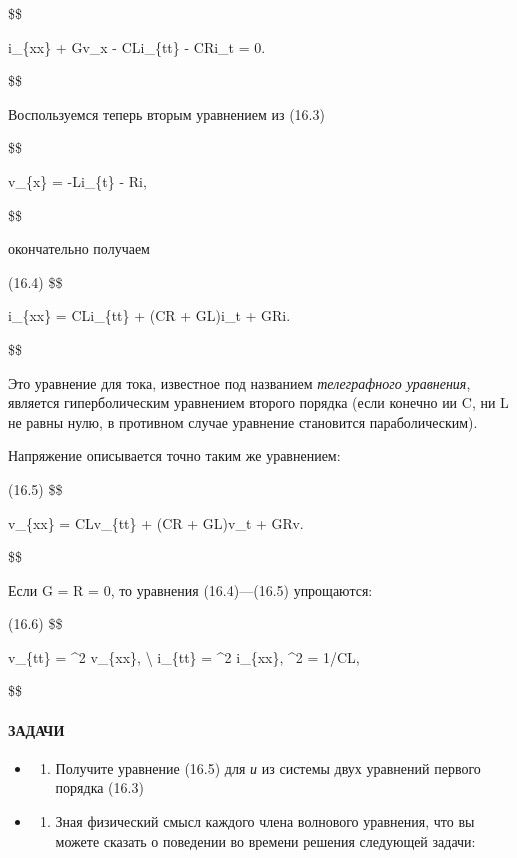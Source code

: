 \documentclass[
  ukrainian,
]{article}
\providecommand{\tightlist}{%
  \setlength{\itemsep}{0pt}\setlength{\parskip}{0pt}}
\begin{document}
\$\$

i\_\{xx\} + Gv\_x - CLi\_\{tt\} - CRi\_t = 0.

\$\$

Воспользуемся теперь вторым уравнением из (16.3)

\$\$

v\_\{x\} = -Li\_\{t\} - Ri,

\$\$

окончательно получаем

(16.4) \$\$

i\_\{xx\} = CLi\_\{tt\} + (CR + GL)i\_t + GRi.

\$\$

Это уравнение для тока, известное под названием \emph{телеграфного
уравнения}, является гиперболическим уравнением второго порядка (если
конечно ии C, ни L не равны нулю, в противном случае уравнение
становится параболическим).

Напряжение описывается точно таким же уравнением:

(16.5) \$\$

v\_\{xx\} = CLv\_\{tt\} + (CR + GL)v\_t + GRv.

\$\$

Если G = R = 0, то уравнения (16.4)---(16.5) упрощаются:

(16.6) \$\$

v\_\{tt\} = \alpha\^{}2 v\_\{xx\}, \textbackslash{} i\_\{tt\} =
\alpha\^{}2 i\_\{xx\}, \qquad \alpha\^{}2 = 1/CL,

\$\$

\paragraph{ЗАДАЧИ}\label{ux437ux430ux434ux430ux447ux438-1}

\begin{itemize}
\tightlist
\item
  \begin{enumerate}
  \def\labelenumi{\arabic{enumi}.}
  \tightlist
  \item
    Получите уравнение (16.5) для \emph{и} из системы двух уравнений
    первого порядка (16.3)
  \end{enumerate}
\item
  \begin{enumerate}
  \def\labelenumi{\arabic{enumi}.}
  \setcounter{enumi}{1}
  \tightlist
  \item
    Зная физический смысл каждого члена волнового уравнения, что вы
    можете сказать о поведении во времени решения следующей задачи:
  \end{enumerate}
\end{itemize}
\end{document}
